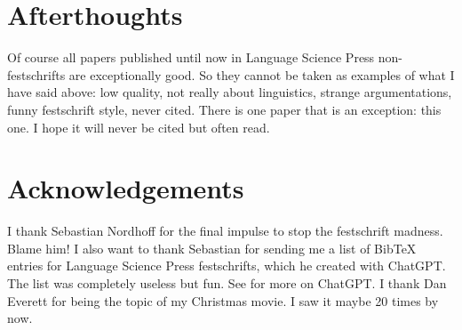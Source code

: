 \documentclass[output=paper,colorlinks,citecolor=brown]{langscibook}
\begin{document}
  


\section*{Afterthoughts}

Of course all papers published until now in Language Science Press non\hyp fest\-schrifts are exceptionally good. So they
cannot be taken as examples of what I have said above: low quality, not really about linguistics,
strange argumentations, funny festschrift style, never cited. There is one paper that is an
exception: this one. I hope it will never be cited but often read.

\section*{Acknowledgements}

I thank Sebastian Nordhoff for the final impulse to stop the festschrift madness. Blame him! I also
want to thank Sebastian for sending me a list of BibTeX entries for Language Science Press
festschrifts, which he created with ChatGPT. The list was completely useless but fun. See
 for more on ChatGPT. I thank
Dan Everett for being the topic of my Christmas movie. I saw it maybe 20 times by now.




{\sloppy\printbibliography[heading=subbibliography,notkeyword=this]}
\end{document}
